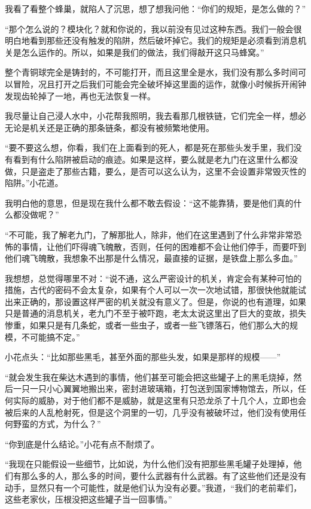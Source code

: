 我看了看整个蜂巢，就陷人了沉思，想了想我问他：“你们的规矩，是怎么做的？”

“那个怎么说的？模块化？就和你说的，我以前没有见过这种东西。我们一般会很明白地看到那些还没有触发的陷阱，然后破坏掉它。我们的规矩是必须看到消息机关是怎么运作的。所以，如果是我们的做法，我们得敲开这只马蜂窝。”

整个青铜球完全是铸封的，不可能打开，而且这里全是水，我们没有那么多时间可以冒险，况且打开之后我们可能会完全破坏掉这里面的运作，就像小时候拆开闹钟发现齿轮掉了一地，再也无法恢复一样。

我尽量让自己浸人水中，小花帮我照明，我去看那几根铁链，它们完全一样，想必无论是机关还是正确的那条链条，都没有被频繁地使用。

“要不要这么想，你看，我们在上面看到的死人，都是死在那些头发手里，我们没有看到有什么陷阱被启动的痕迹。如果是这样，要么就是老九门在这里什么都没做，只是盗走了那些古籍，要么，是否可以这么认为，这里不会设置非常毁灭性的陷阱。”小花道。

我明白他的意思，但是现在我什么都不敢去假设：“这不能靠猜，要是他们真的什么都没做呢？”

“不可能，我了解老九门，了解那批人，除非，他们在这里遇到了什么非常非常恐怖的事情，让他们吓得魂飞魄散，否则，任何的困难都不会让他们停手，而要吓到他们魂飞魄散，我想象不出那是什么情况，最直接的证据，是铁盘上那么多血。”

我想想，总觉得哪里不对：“说不通，这么严密设计的机关，肯定会有某种可怕的措施，古代的密码不会太复杂，如果有个人可以一次一次地试错，那很快他就能试出来正确的，那设置这样严密的机关就没有意义了。但是，你说的也有道理，如果只是普通的消息机关，老九门不至于被吓跑，老太太说这里出了巨大的变故，损失惨重，如果只是有几条蛇，或者一些虫子，或者一些飞镖落石，他们那么大的规模，不可能搞不定。”

小花点头：“比如那些黑毛，甚至外面的那些头发，如果是那样的规模——”

“就会发生我在柴达木遇到的事情，他们甚至可能会把这些罐子上的黑毛烧掉，然后一只一只小心翼翼地搬出来，密封进玻璃箱，打包送到国家博物馆去，所以，任何实际的威胁，对于他们都不是威胁，就是这里有只恐龙杀了十几个人，立即也会被后来的人乱枪射死，但是这个洞里的一切，几乎没有被破坏过，他们没有使用任何野蛮的方式，为什么？”

“你到底是什么结论。”小花有点不耐烦了。

“我现在只能假设一些细节，比如说，为什么他们没有把那些黑毛罐子处理掉，他们有那么多的人，那么多的时间，要什么武器有什么武器。有了这些他们还是没有动手，显然只有一个可能性，就是他们认为没有必要。”我道，“我们的老前辈们，这些老家伙，压根没把这些罐子当一回事情。”

